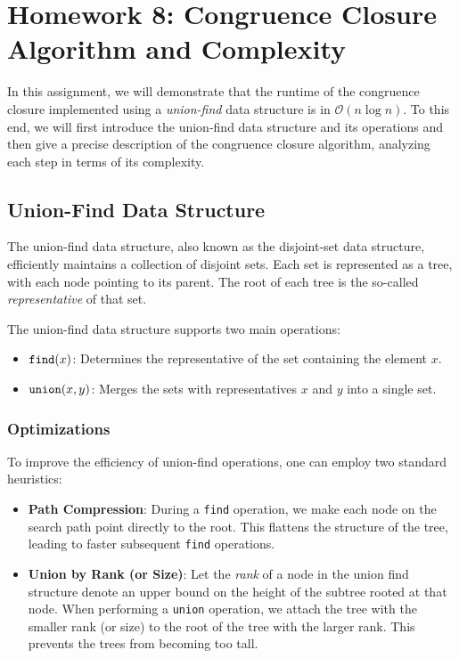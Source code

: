 \newcommand{\Oh}{\ensuremath{\mathcal{O}}}
\newcommand{\FIND}[1]{\ensuremath{\mbox{\texttt{find}}(#1)}}
\newcommand{\find}{\texttt{find}}
\newcommand{\union}{\texttt{union}}
\newcommand{\UNION}[1]{\ensuremath{\mbox{\texttt{union}}(#1)}}

\section{Homework 8: Congruence Closure Algorithm and Complexity}

In this assignment, we will demonstrate that the runtime of the congruence closure implemented
using a \emph{union-find} data structure is in $\Oh(n \log n)$. To this end, we will first
introduce the union-find data structure and its operations and then give a precise description
of the congruence closure algorithm, analyzing each step in terms of its complexity.

\subsection{Union-Find Data Structure}

The union-find data structure, also known as the disjoint-set data structure,
efficiently maintains a collection of disjoint sets.
Each set is represented as a tree, with each node pointing to its parent. The
root of each tree is the so-called \emph{representative} of that set.

The union-find data structure supports two main operations:

\begin{itemize}
  \item \FIND{x}: Determines the representative of the set containing the element $x$.
  \item \UNION{x, y}:
Merges the sets with representatives $x$ and $y$ into a single set.
\end{itemize}


\subsubsection{Optimizations}

To improve the efficiency of union-find operations, one can employ two standard heuristics:

\begin{itemize}
  \item \textbf{Path Compression}: During a \find{} operation, we make each node
  on the search path point directly to the root. This flattens the structure of
  the tree, leading to faster subsequent \find{} operations.
  \item
  \textbf{Union by Rank (or Size)}:
  Let the \emph{rank} of a node in the union find structure denote
  an upper bound on the height of the subtree rooted at that node.
  When performing a \union{} operation, we attach the tree
  with the smaller rank (or size) to the root of the tree with the larger rank.
  This prevents the trees from becoming too tall.
\end{itemize}

